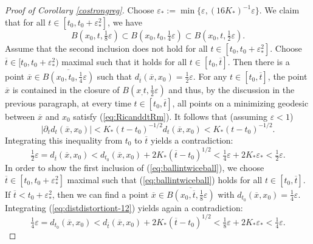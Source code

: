 \documentclass[11pt]{amsart}
\numberwithin{equation}{section}
\def\eps{\varepsilon}
\def\eps{\varepsilon}
\numberwithin{equation}{section}
\begin{document}
\begin{proof}[Proof of Corollary \ref{costrongreg}]
Choose $\eps_* := \min \{ \eps, (16 K_*)^{-1} \eps \}$.
We claim that for all $t \in [t_0, t_0 + \eps_*^2 ]$, we have
\begin{equation} \label{eq:ballintwiceball}
B(x_0, t, \tfrac18 \eps ) \subset B(x_0, t_0, \tfrac14 \eps ) \subset B(x_0, t, \tfrac12 \eps ).
\end{equation}
Assume that the second inclusion does not hold for all $t \in [t_0, t_0 + \eps_*^2 ]$.
Choose $\overline{t} \in [t_0, t_0 + \eps_*^2 )$ maximal such that it holds for all $t \in [t_0, \overline{t}]$.
Then there is a point $\overline{x} \in \overline{B(x_0, t_0, \frac14 \eps  )}$ such that $d_{\overline{t}}(\overline{x}, x_0) = \frac12 \eps $.
For any $t \in [t_0, \overline{t}]$, the point $\overline{x}$ is contained in the closure of $B(x_, t, \frac12 \eps )$ and thus, by the discussion in the previous paragraph, at every time $t \in [t_0, \overline{t}]$, all points on a minimizing geodesic between $\overline{x}$ and $x_0$ satisfy (\ref{eq:RicanddtRm}).
It follows that (assuming $\eps < 1$)
\begin{equation} \label{eq:distdistortiont-12}
  |{\partial_t d_t (\overline{x}, x_0)}| <  K_* (t - t_0)^{-1/2} d_t ( \overline{x}, x_0 ) < K_* (t - t_0)^{-1/2}.
\end{equation}
Integrating this inequality from $t_0$ to $\overline{t}$ yields a contradiction:
\[ \tfrac12 \eps  = d_{\overline{t}} (\overline{x}, x_0)  < d_{t_0} (\overline{x}, x_0) + 2 K_* (\overline{t} - t_0)^{1/2} < \tfrac14 \eps  + 2 K_* \eps_*  < \tfrac12 \eps . \]
In order to show the first inclusion of (\ref{eq:ballintwiceball}), we choose $\overline{t} \in [t_0, t_0 + \eps_*^2]$ maximal such that (\ref{eq:ballintwiceball}) holds for all $t \in [t_0, \overline{t}]$.
If $\overline{t} < t_0 + \eps_*^2$, then we can find a point $\overline{x} \in \overline{B(x_0, \overline{t}, \frac18 \eps)}$ with $d_{t_0} (\overline{x}, x_0) = \frac14 \eps$.
Integrating (\ref{eq:distdistortiont-12}) yields again a contradiction:
\[ \tfrac14 \eps = d_{t_0} (\overline{x}, x_0) < d_{\overline{t}} (\overline{x}, x_0) + 2 K_* (\overline{t} - t_0)^{1/2} < \tfrac18 \eps + 2 K_* \eps_*  < \tfrac14 \eps. \]


\end{proof}
\end{document}

